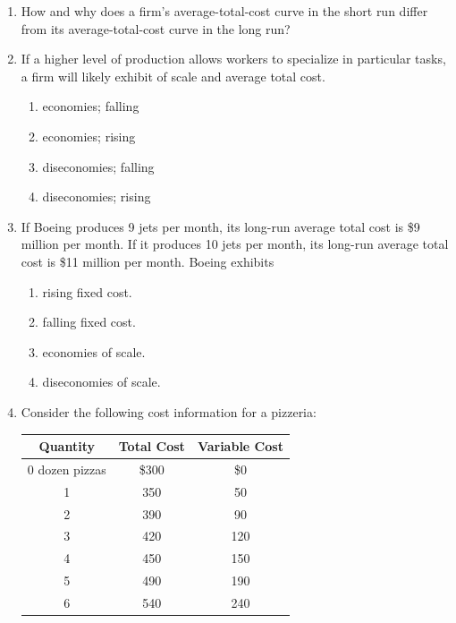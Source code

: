 \documentclass{article}
\begin{document}
\begin{enumerate}

\item How and why does a firm's average-total-cost curve in the short run differ from its average-total-cost curve in the long run?

\item If a higher level of production allows workers to specialize in particular tasks, a firm will likely exhibit \underline{\phantom{xxxxxxxxxx}} of scale and \underline{\phantom{xxxxxxxxxx}} average total cost.

	\begin{enumerate}
	
	\item economies; falling
	
	\item economies; rising
	
	\item diseconomies; falling
	
	\item diseconomies; rising
	
	\end{enumerate}
	
\item If Boeing produces 9 jets per month, its long-run average total cost is \$9 million per month. If it produces 10 jets per month, its long-run average total cost is \$11 million per month. Boeing exhibits

	\begin{enumerate}

	\item rising fixed cost.
	
	\item falling fixed cost.
	
	\item economies of scale.
	
	\item diseconomies of scale.
	
	\end{enumerate}

\item Consider the following cost information for a pizzeria:

	\begin{center}
	\begin{tabular}{c | c | c}
	\textbf{Quantity} & \textbf{Total Cost} & \textbf{Variable Cost} \\
	\hline
	0 dozen pizzas & \$300 & \$0 \\
	1 & 350 & 50 \\
	2 & 390 & 90 \\
	3 & 420 & 120 \\
	4 & 450 & 150 \\
	5 & 490 & 190 \\
	6 & 540 & 240 \\
	\end{tabular}
	\end{center}
	

\end{enumerate}
\end{document}

